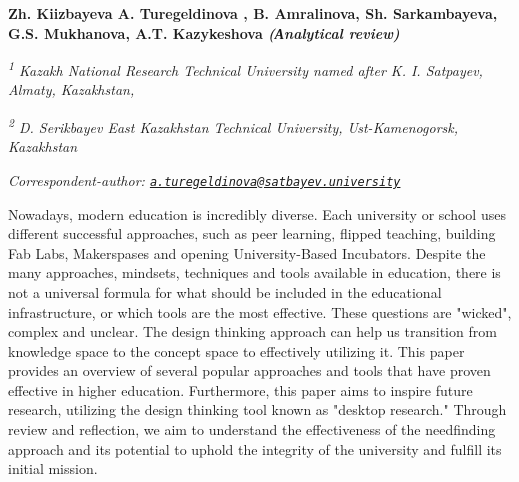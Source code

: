 
\begin{articleheader}

{\bfseries Zh. Kiizbayeva
A. Turegeldinova\textsuperscript{\envelope } ,
B. Amralinova,
Sh. Sarkambayeva,
G.S. Mukhanova,
A.T. Kazykeshova
\emph{(Аnalytical review)}}
\end{articleheader}

\begin{affiliation}
\emph{\textsuperscript{1} Kazakh National Research Technical University named after K. I. Satpayev, Almaty, Kazakhstan,}

\emph{\textsuperscript{2} D. Serikbayev East Kazakhstan Technical University, Ust-Kamenogorsk, Kazakhstan}

\raggedright \textsuperscript{\envelope }{\em Correspondent-author: \href{mailto:a.turegeldinova@satbayev.university}{\nolinkurl{a.turegeldinova@satbayev.university}}}
\end{affiliation}

Nowadays, modern education is incredibly diverse. Each university or
school uses different successful approaches, such as peer learning,
flipped teaching, building Fab Labs, Makerspases and opening
University-Based Incubators. Despite the many approaches, mindsets,
techniques and tools available in education, there is not a universal
formula for what should be included in the educational infrastructure,
or which tools are the most effective. These questions are "wicked",
complex and unclear. The design thinking approach can help us transition
from knowledge space to the concept space to effectively utilizing it.
This paper provides an overview of several popular approaches and tools
that have proven effective in higher education. Furthermore, this paper
aims to inspire future research, utilizing the design thinking tool
known as "desktop research." Through review and reflection, we aim to
understand the effectiveness of the needfinding approach and its
potential to uphold the integrity of the university and fulfill its
initial mission.


